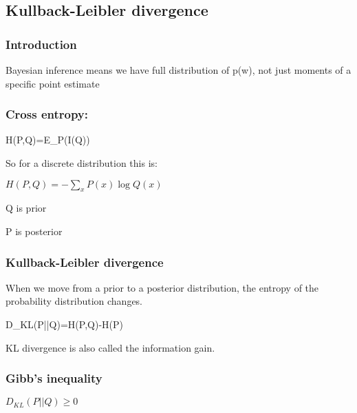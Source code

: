 
\subsection{Kullback-Leibler divergence}
\subsubsection{Introduction}

Bayesian inference means we have full distribution of p(w), not just moments of a specific point estimate

\subsubsection{Cross entropy:}

H(P,Q)=E_P(I(Q))

So for a discrete distribution this is:

\(H(P,Q)=-\sum_x P(x)\log Q(x)\)

Q is prior

P is posterior

\subsubsection{Kullback-Leibler divergence}

When we move from a prior to a posterior distribution, the entropy of the probability distribution changes.

D_{KL}(P||Q)=H(P,Q)-H(P)

KL divergence is also called the information gain.

\subsubsection{Gibb's inequality}

\(D_{KL}(P||Q)\ge 0\)

